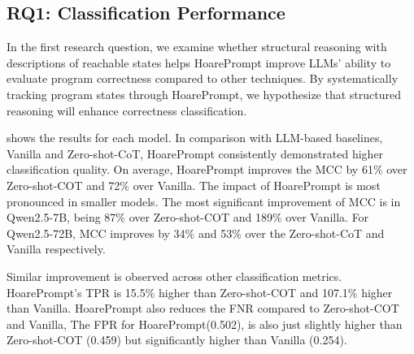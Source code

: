 \documentclass[sigconf]{acmart}
\newcommand{\projName}{HoarePrompt\xspace}
\begin{document}
\subsection{RQ1: Classification Performance}

In the first research question, we examine whether structural reasoning with descriptions of reachable states helps \projName improve  LLMs' ability to evaluate program correctness compared to other techniques. By systematically  tracking program states through \projName, we hypothesize that structured reasoning will enhance correctness classification.


 shows the results for each model. In comparison with LLM-based baselines, Vanilla and Zero-shot-CoT, \projName consistently demonstrated higher classification quality. On average, \projName improves the MCC by 61\% over Zero-shot-COT and 72\% over Vanilla. The impact of \projName is most pronounced in smaller models. The most significant improvement of MCC is in Qwen2.5-7B, being 87\% over Zero-shot-COT and 189\% over Vanilla. For Qwen2.5-72B, MCC improves by 34\%  and 53\% over the Zero-shot-CoT and Vanilla respectively. 

Similar improvement is observed across other classification metrics. \projName's TPR is 15.5\% higher than Zero-shot-COT and 107.1\% higher than Vanilla. \projName also reduces the FNR compared to Zero-shot-COT and Vanilla, The FPR for \projName (0.502), is also just slightly higher than Zero-shot-COT (0.459) but significantly higher than Vanilla (0.254).

\end{document}
